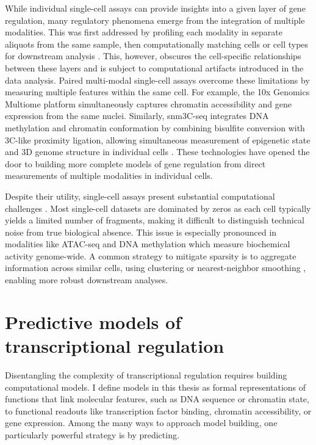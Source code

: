 \begin{dissertationintroduction}
While individual single-cell assays can provide insights into a given layer of gene regulation, many regulatory phenomena emerge from the integration of multiple modalities. This was first addressed by profiling each modality in separate aliquots from the same sample, then computationally matching cells or cell types for downstream analysis \cite{Argelaguet2021-ws}. This, however, obscures the cell-specific relationships between these layers and is subject to computational artifacts introduced in the data analysis. Paired multi-modal single-cell assays overcome these limitations by measuring multiple features within the same cell. For example, the 10x Genomics Multiome platform simultaneously captures chromatin accessibility and gene expression from the same nuclei. Similarly, snm3C-seq integrates DNA methylation and chromatin conformation by combining bisulfite conversion with 3C-like proximity ligation, allowing simultaneous measurement of epigenetic state and 3D genome structure in individual cells \cite{Liu2021-km,Lee2019-qo}. These technologies have opened the door to building more complete models of gene regulation from direct measurements of multiple modalities in individual cells.

Despite their utility, single-cell assays present substantial computational challenges \cite{Heumos2023-hq,Kharchenko2021-ba}. Most single-cell datasets are dominated by zeros as each cell typically yields a limited number of fragments, making it difficult to distinguish technical noise from true biological absence. This issue is especially pronounced in modalities like ATAC-seq and DNA methylation which measure biochemical activity genome-wide. A common strategy to mitigate sparsity is to aggregate information across similar cells, using clustering or nearest-neighbor smoothing \cite{Kiselev2019-ky}, enabling more robust downstream analyses.

\section{Predictive models of transcriptional regulation}

Disentangling the complexity of transcriptional regulation requires building computational models. I define models in this thesis as formal representations of functions that link molecular features, such as DNA sequence or chromatin state, to functional readouts like transcription factor binding, chromatin accessibility, or gene expression. Among the many ways to approach model building, one particularly powerful strategy is by predicting.


\end{dissertationintroduction}
